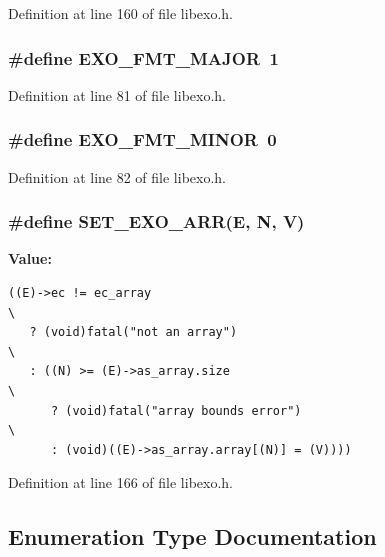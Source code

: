 Definition at line 160 of file libexo.h.
\subsubsection[{EXO\_\-FMT\_\-MAJOR}]{\setlength{\rightskip}{0pt plus 5cm}\#define EXO\_\-FMT\_\-MAJOR~1}\label{libexo_8h_6cbad4c15ea545642884c960bcd7deff}




Definition at line 81 of file libexo.h.
\subsubsection[{EXO\_\-FMT\_\-MINOR}]{\setlength{\rightskip}{0pt plus 5cm}\#define EXO\_\-FMT\_\-MINOR~0}\label{libexo_8h_706a392f2f63aef68afab1abb7bbc664}




Definition at line 82 of file libexo.h.
\subsubsection[{SET\_\-EXO\_\-ARR}]{\setlength{\rightskip}{0pt plus 5cm}\#define SET\_\-EXO\_\-ARR(E, \/  N, \/  V)}\label{libexo_8h_4083decefe8932885188e141dc23662e}


\textbf{Value:}

\begin{Code}\begin{verbatim}((E)->ec != ec_array                                                    \
   ? (void)fatal("not an array")                                        \
   : ((N) >= (E)->as_array.size                                         \
      ? (void)fatal("array bounds error")                               \
      : (void)((E)->as_array.array[(N)] = (V))))
\end{verbatim}
\end{Code}


Definition at line 166 of file libexo.h.

\subsection{Enumeration Type Documentation}
